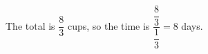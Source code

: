 The total is $\dfrac{8}{3}$ cups, so the time is $\dfrac{\dfrac{8}{3}}{\dfrac{1}{3}}=\boxed8$ days.

